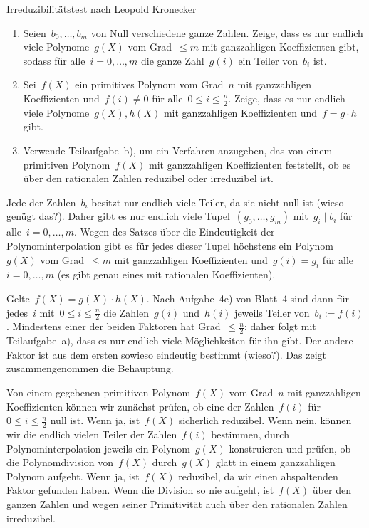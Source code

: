 \documentclass{algblatt}
\begin{document}
\begin{aufgabe}{Irreduzibilitätstest nach Leopold Kronecker}
\begin{enumerate}
\item Seien~$b_0,\ldots,b_m$ von Null verschiedene ganze Zahlen. Zeige, dass es
nur endlich viele Polynome~$g(X)$ vom Grad~$\leq m$ mit ganzzahligen Koeffizienten
gibt, sodass für alle~$i = 0,\ldots,m$ die ganze Zahl~$g(i)$ ein Teiler
von~$b_i$ ist.
\item Sei~$f(X)$ ein primitives Polynom vom Grad~$n$ mit ganzzahligen
Koeffizienten und~$f(i) \neq 0$ für alle~$0 \leq i \leq \frac{n}{2}$. Zeige,
dass es nur endlich viele Polynome~$g(X), h(X)$ mit ganzzahligen Koeffizienten
und~$f = g \cdot h$ gibt.
\item Verwende Teilaufgabe~b), um ein Verfahren anzugeben, das von einem
primitiven Polynom~$f(X)$ mit ganzzahligen Koeffizienten feststellt, ob es
über den rationalen Zahlen reduzibel oder irreduzibel ist.
\end{enumerate}

\begin{loesungE}
\item Jede der Zahlen~$b_i$ besitzt nur endlich viele Teiler, da sie nicht null
ist (wieso genügt das?). Daher gibt es nur endlich viele Tupel~$(g_0,\ldots,g_m)$ mit~$g_i \mid
b_i$ für alle~$i = 0,\ldots,m$. Wegen des Satzes über die Eindeutigkeit der
Polynominterpolation gibt es für jedes dieser Tupel höchstens ein
Polynom~$g(X)$ vom Grad~$\leq m$ mit ganzzahligen Koeffizienten und~$g(i)
= g_i$ für alle~$i = 0,\ldots,m$ (es gibt genau eines mit rationalen
Koeffizienten).

\item Gelte~$f(X) = g(X) \cdot h(X)$.
Nach Aufgabe~4e) von Blatt~4 sind dann
für jedes~$i$ mit~$0 \leq i \leq \frac{n}{2}$ die Zahlen~$g(i)$ und~$h(i)$
jeweils Teiler von~$b_i := f(i)$. Mindestens einer der beiden Faktoren hat
Grad~$\leq \frac{n}{2}$; daher folgt mit Teilaufgabe~a), dass es nur endlich
viele Möglichkeiten für ihn gibt. Der andere Faktor ist aus dem ersten sowieso
eindeutig bestimmt (wieso?). Das zeigt zusammengenommen die Behauptung.

\item Von einem gegebenen primitiven Polynom~$f(X)$ vom Grad~$n$ mit ganzzahligen
Koeffizienten können wir zunächst prüfen, ob eine der Zahlen~$f(i)$ für~$0 \leq i
\leq \frac{n}{2}$ null ist. Wenn ja, ist~$f(X)$ sicherlich reduzibel. Wenn
nein, können wir die endlich vielen Teiler der Zahlen~$f(i)$ bestimmen, durch
Polynominterpolation jeweils ein Polynom~$g(X)$ konstruieren und prüfen, ob die
Polynomdivision von~$f(X)$ durch~$g(X)$ glatt in einem ganzzahligen Polynom
aufgeht. Wenn ja, ist~$f(X)$ reduzibel, da wir einen abspaltenden Faktor
gefunden haben. Wenn die Division so nie aufgeht, ist~$f(X)$ über den ganzen
Zahlen und wegen seiner Primitivität auch über den rationalen Zahlen
irreduzibel.


\end{loesungE}
\end{aufgabe}
\end{document}
